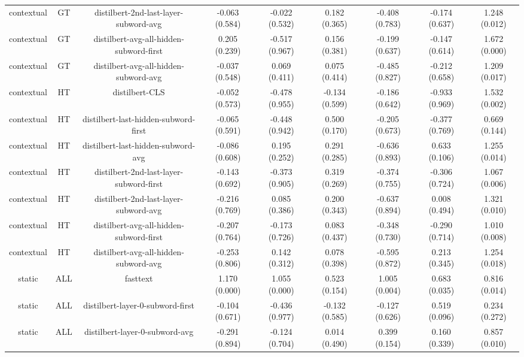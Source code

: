 \begin{sidewaystable}[htb]
\begin{tabular}{@{}ccccccccc@{}}
        contextual & GT & distilbert-2nd-last-layer-subword-avg & -0.063 (0.584) & -0.022 (0.532) & 0.182 (0.365) & -0.408 (0.783) & -0.174 (0.637) & 1.248 (0.012) \\
        contextual & GT & distilbert-avg-all-hidden-subword-first & 0.205 (0.239) & -0.517 (0.967) & 0.156 (0.381) & -0.199 (0.637) & -0.147 (0.614) & 1.672 (0.000) \\
        contextual & GT & distilbert-avg-all-hidden-subword-avg & -0.037 (0.548) & 0.069 (0.411) & 0.075 (0.414) & -0.485 (0.827) & -0.212 (0.658) & 1.209 (0.017) \\
        contextual & HT & distilbert-CLS & -0.052 (0.573) & -0.478 (0.955) & -0.134 (0.599) & -0.186 (0.642) & -0.933 (0.969) & 1.532 (0.002) \\
        contextual & HT & distilbert-last-hidden-subword-first & -0.065 (0.591) & -0.448 (0.942) & 0.500 (0.170) & -0.205 (0.673) & -0.377 (0.769) & 0.669 (0.144) \\
        contextual & HT & distilbert-last-hidden-subword-avg & -0.086 (0.608) & 0.195 (0.252) & 0.291 (0.285) & -0.636 (0.893) & 0.633 (0.106) & 1.255 (0.014) \\
        contextual & HT & distilbert-2nd-last-layer-subword-first & -0.143 (0.692) & -0.373 (0.905) & 0.319 (0.269) & -0.374 (0.755) & -0.306 (0.724) & 1.067 (0.006) \\
        contextual & HT & distilbert-2nd-last-layer-subword-avg & -0.216 (0.769) & 0.085 (0.386) & 0.200 (0.343) & -0.637 (0.894) & 0.008 (0.494) & 1.321 (0.010) \\
        contextual & HT & distilbert-avg-all-hidden-subword-first & -0.207 (0.764) & -0.173 (0.726) & 0.083 (0.437) & -0.348 (0.730) & -0.290 (0.714) & 1.010 (0.008) \\
        contextual & HT & distilbert-avg-all-hidden-subword-avg & -0.253 (0.806) & 0.142 (0.312) & 0.078 (0.398) & -0.595 (0.872) & 0.213 (0.345) & 1.254 (0.018) \\
        static & ALL & fasttext & 1.170 (0.000) & 1.055 (0.000) & 0.523 (0.154) & 1.005 (0.004) & 0.683 (0.035) & 0.816 (0.014) \\
        static & ALL & distilbert-layer-0-subword-first & -0.104 (0.671) & -0.436 (0.977) & -0.132 (0.585) & -0.127 (0.626) & 0.519 (0.096) & 0.234 (0.272) \\
        static & ALL & distilbert-layer-0-subword-avg & -0.291 (0.894) & -0.124 (0.704) & 0.014 (0.490) & 0.399 (0.154) & 0.160 (0.339) & 0.857 (0.010) \\

\end{tabular}
\end{sidewaystable}
